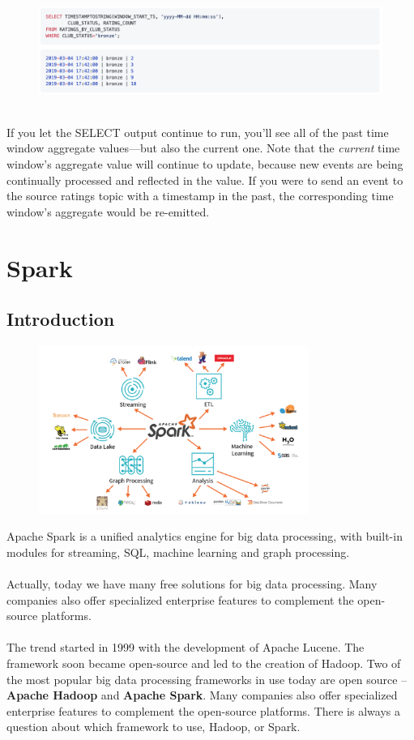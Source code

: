 \documentclass[10pt,a4paper]{article}
\newcommand{\nline}{\\~\\}
\begin{document}
\begin{enumerate}
   \begin{figure}[ht!]
 \hfill \includegraphics[width=400pt]{images/ksql-cmd24}\hspace*{\fill}
 \end{figure} \\
 If you let the SELECT output continue to run, you’ll see all of the past time window aggregate values—but also the current one. Note that the \textit{current} time window’s aggregate value will continue to update, because new events are being continually processed and reflected in the value. If you were to send an event to the source ratings topic with a timestamp in the past, the corresponding time window’s aggregate would be re-emitted.
 \end{enumerate}
 
 \pagebreak
 
 \section{Spark}
 \subsection{Introduction}
    \begin{figure}[ht!]
 \hfill \includegraphics[width=250pt]{images/spark-intro}\hspace*{\fill}
 \end{figure} 
 Apache Spark is a unified analytics engine for big data processing, with built-in modules for streaming, SQL, machine learning and graph processing.
 \nline
Actually, today we have many free solutions for big data processing. Many companies also offer specialized enterprise features to complement the open-source platforms.
\nline
The trend started in 1999 with the development of Apache Lucene. The framework soon became open-source and led to the creation of Hadoop. Two of the most popular big data processing frameworks in use today are open source – \textbf{Apache Hadoop} and \textbf{Apache Spark}. Many companies also offer specialized enterprise features to complement the open-source platforms.
There is always a question about which framework to use, Hadoop, or Spark.
\end{document}
